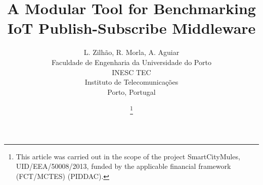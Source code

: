 \documentclass[conference]{IEEEtran}
\begin{document}
\title{A Modular Tool for Benchmarking IoT Publish-Subscribe Middleware}

\author{
L. Zilh\~ao, R. Morla, A. Aguiar\\
Faculdade de Engenharia da Universidade do Porto\\
INESC TEC\\
Instituto de Telecomunica\c c\~oes\\
Porto, Portugal
}
\author{%
        \thanks{This article was carried out in the scope of the project SmartCityMules, UID/EEA/50008/2013, funded by the applicable financial framework (FCT/MCTES) (PIDDAC). }
} 

\maketitle
\end{document}
